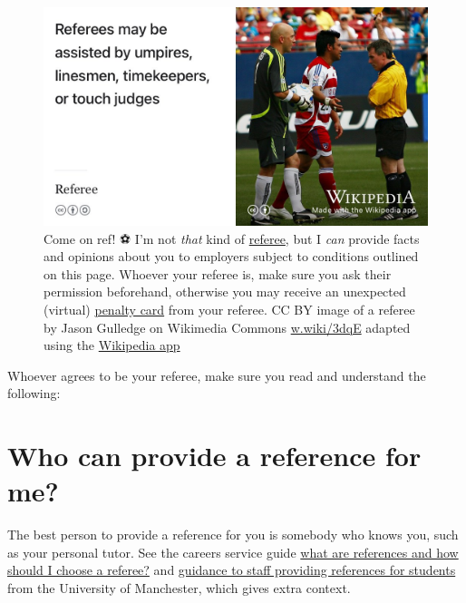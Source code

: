\documentclass[
  12pt,
]{book}
\begin{document}
\begin{figure}

{\centering \includegraphics[width=0.99\linewidth]{images/referee} 

}

\caption{Come on ref! ⚽️ I'm not \emph{that} kind of \href{https://en.wikipedia.org/wiki/Referee}{referee}, but I \emph{can} provide facts and opinions about you to employers subject to conditions outlined on this page. Whoever your referee is, make sure you ask their permission beforehand, otherwise you may receive an unexpected (virtual) \href{https://en.wikipedia.org/wiki/Penalty_card}{penalty card} from your referee. CC BY image of a referee by Jason Gulledge on Wikimedia Commons \href{https://w.wiki/3dqE}{w.wiki/3dqE} adapted using the \href{https://apps.apple.com/us/app/wikipedia/id324715238}{Wikipedia app}}\label{fig:referee-fig}
\end{figure}



Whoever agrees to be your referee, make sure you read and understand the following:

\hypertarget{who-can-provide-a-reference-for-me}{%
\section{Who can provide a reference for me?}\label{who-can-provide-a-reference-for-me}}

The best person to provide a reference for you is somebody who knows you, such as your personal tutor. See the careers service guide \href{http://www.careers.manchester.ac.uk/applicationsinterviews/faqs/references}{what are references and how should I choose a referee?} and \href{http://documents.manchester.ac.uk/display.aspx?DocID=1921}{guidance to staff providing references for students} from the University of Manchester, which gives extra context.
\end{document}
